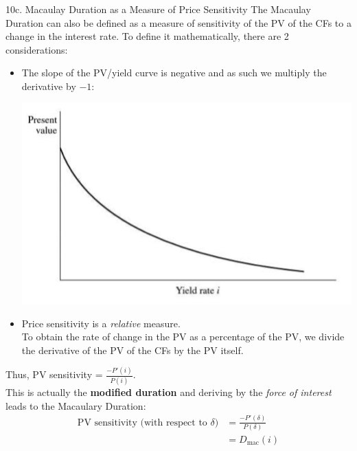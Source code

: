 \begin{CHPT_SUMM_AUTO}[label = {L.-10c}]{10c. Macaulay Duration as a Measure of Price Sensitivity}
The Macaulay Duration can also be defined as a measure of sensitivity of the PV of the CFs to a change in the interest rate. To define it mathematically, there are 2 considerations:
\begin{itemize}[leftmargin = *]
	\item	The slope of the PV/yield curve is negative and as such we multiply the derivative by $-1$:
	\begin{center}
		\includegraphics[scale=0.35]{img/duration-slope.png}
	\end{center}
	\item	Price sensitivity is a \textit{relative} measure.\\
			To obtain the rate of change in the PV as a percentage of the PV, we divide the derivative of the PV of the CFs by the PV itself.
\end{itemize}

Thus, PV sensitivity = $\frac{-P'(i)}{P(i)}$. \\
This is actually the \textbf{modified duration} and deriving by the \textit{force of interest} leads to the Macaulary Duration:
\begin{align*}
	\text{PV sensitivity (with respect to $\delta$)}
	&=	\frac{-P'(\delta)}{P(\delta)}	\\
	&=	D_{\text{mac}}(i)
\end{align*}

\end{CHPT_SUMM_AUTO}

